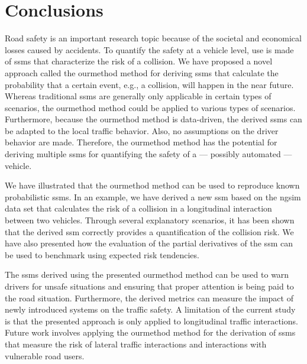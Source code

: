 \section{Conclusions}
\label{sec:conclusions}

Road safety is an important research topic because of the societal and economical losses caused by accidents.
To quantify the safety at a vehicle level, use is made of \acp{ssm} that characterize the risk of a collision. 
\cstarta We have proposed a novel approach called the \ac{ourmethod} method for deriving \acp{ssm} that calculate the probability that a certain event, e.g., a collision, will happen in the near future. 
Whereas traditional \acp{ssm} are generally only applicable in certain types of scenarios, the \ac{ourmethod} method could be applied to various types of scenarios.
Furthermore, because the \ac{ourmethod} method is data-driven, the derived \acp{ssm} can be adapted to the local traffic behavior. 
Also, no assumptions on the driver behavior are made.
Therefore, the \ac{ourmethod} method has the potential for deriving multiple \acp{ssm} for quantifying the safety of a --- possibly automated --- vehicle.

We have illustrated that the \ac{ourmethod} method can be used to reproduce known probabilistic \acp{ssm}.
In an example, we have derived a new \ac{ssm} based on the \ac{ngsim} data set that calculates the risk of a collision in a longitudinal interaction between two vehicles.
Through several explanatory scenarios, it has been shown that the derived \ac{ssm} correctly provides a quantification of the collision risk.
We have also presented how the evaluation of the partial derivatives of the \ac{ssm} can be used to benchmark  using expected risk tendencies. \cenda

The \acp{ssm} derived using the presented \ac{ourmethod} method can be used to warn drivers for unsafe situations and ensuring that proper attention is being paid to the road situation.
Furthermore, the derived metrics can measure the impact of newly introduced systems on the traffic safety. 
A limitation of the current study is that the presented approach is only applied to longitudinal traffic interactions. 
\cstarta Future work involves applying the \ac{ourmethod} method for the derivation of \acp{ssm} that measure the risk of lateral traffic interactions and interactions with vulnerable road users. \cenda
